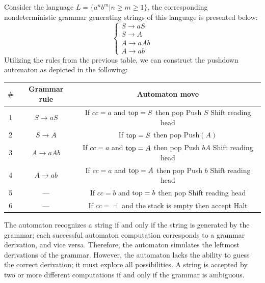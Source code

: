 \begin{example}
    Consider the language $L=\{a^nb^m|n \geq m \geq 1\}$, the corresponding nondeterministic grammar generating strings of this language is presented below:
    \[\begin{cases}
        S \rightarrow aS \\
        S \rightarrow A \\
        A \rightarrow aAb \\
        A \rightarrow ab
    \end{cases}\]
    Utilizing the rules from the previous table, we can construct the pushdown automaton as depicted in the following:
    \begin{table}[H]
        \centering
        \begin{tabular}{ccc}
        \hline
        $\#$ & \textbf{Grammar rule}    & \textbf{Automaton move}                                                                                   \\ \hline
        1    & $ S \rightarrow aS$      & \makecell{If $cc=a$ and $\textnormal{top}=S$ then pop \\ Push $S$ \\ Shift reading head}                  \\ 
        2    & $S \rightarrow A$        & \makecell{If $\textnormal{top}=S$ then pop \\ Push$(A)$   }                                               \\ 
        3    & $A \rightarrow aAb$      & \makecell{If $cc=a$ and $\textnormal{top}=A$ then pop \\ Push $bA$ \\ Shift reading head}                 \\ 
        4    & $A \rightarrow ab$       & \makecell{If $cc=a$ and $\textnormal{top}=A$ then pop \\ Push $b$ \\ Shift reading head}                  \\ 
        5    & ---                      & \makecell{If $cc=b$ and $\textnormal{top}=b$ then pop \\ Shift reading head}                              \\ 
        6    & ---                      & \makecell{If $cc=\dashv$ and the stack is empty then accept \\ Halt}                                      \\ \hline
        \end{tabular}
    \end{table}
\end{example}
The automaton recognizes a string if and only if the string is generated by the grammar; each successful automaton computation corresponds to a grammar derivation, and vice versa.
Therefore, the automaton simulates the leftmost derivations of the grammar.
However, the automaton lacks the ability to guess the correct derivation; it must explore all possibilities.
A string is accepted by two or more different computations if and only if the grammar is ambiguous.

